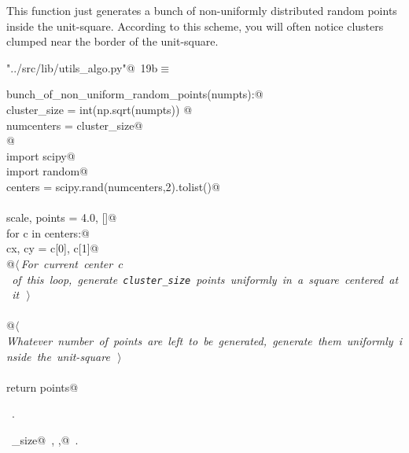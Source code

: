 \documentclass[11.5pt]{report}
\begin{document}
\vspace{-0.8cm} \newchunk This function just generates a bunch of non-uniformly distributed
random points inside the unit-square. According to this scheme, you will often notice
clusters clumped near the border of the unit-square. 
\begin{flushleft} \small\label{scrap18}\raggedright\small
{} \verb@"../src/lib/utils_algo.py"@\nobreak\ {\footnotesize {19b}}$\equiv$
\vspace{-1ex}
\begin{list}{}{} \item
\mbox{}\verb@def bunch_of_non_uniform_random_points(numpts):@\\
\mbox{}\verb@    cluster_size = int(np.sqrt(numpts)) @\\
\mbox{}\verb@    numcenters   = cluster_size@\\
\mbox{}\verb@    @\\
\mbox{}\verb@    import scipy@\\
\mbox{}\verb@    import random@\\
\mbox{}\verb@    centers = scipy.rand(numcenters,2).tolist()@\\
\mbox{}\verb@@\\
\mbox{}\verb@    scale, points = 4.0, []@\\
\mbox{}\verb@    for c in centers:@\\
\mbox{}\verb@        cx, cy = c[0], c[1]@\\
\mbox{}\verb@        @\hbox{$\langle\,${\itshape For current center $c$ of this loop, generate \verb|cluster_size| points uniformly in a square centered at it}\nobreak\ {\footnotesize {}}$\,\rangle$}\verb@@\\
\mbox{}\verb@@\\
\mbox{}\verb@    @\hbox{$\langle\,${\itshape Whatever number of points are left to be generated, generate them uniformly inside the unit-square}\nobreak\ {\footnotesize {}}$\,\rangle$}\verb@@\\
\mbox{}\verb@@\\
\mbox{}\verb@    return points@\\
\mbox{}\verb@@{\NWsep}
\end{list}
\vspace{-1.5ex}
\footnotesize
\begin{list}{}{\setlength{\itemsep}{-\parsep}\setlength{\itemindent}{-\leftmargin}}
\item \NWtxtFileDefBy\ .
\item \NWtxtIdentsDefed\nobreak\  \verb@cluster_size@\nobreak\ , \verb@scale,@\nobreak\ .
\item{}
\end{list}
\vspace{4ex}
\end{flushleft}
\end{document}
